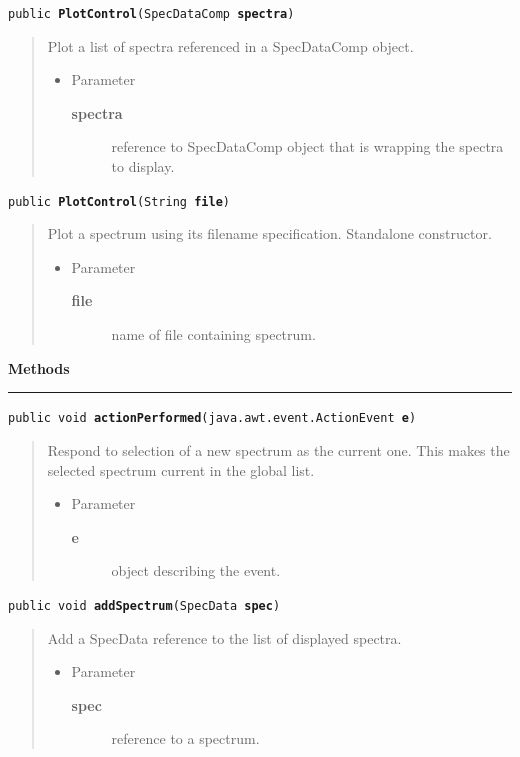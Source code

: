 \documentclass[twoside,11pt]{article}
\renewcommand{\_}{\texttt{\symbol{95}}}
\newcommand{\method}[1]{\texttt{#1}}
\newenvironment{desc}{\begin{quote}}{\end{quote}}
\newcommand{\methods}{
   \par\textbf{\large{Methods}}\\
   \hrule
}
\begin{document}
\method{public \textbf{PlotControl}(\texttt{SpecDataComp} \textbf{spectra})\label{l132}\label{l133}}
\begin{desc}Plot a list of spectra referenced in a SpecDataComp object.
\begin{itemize}
\item{Parameter
  \begin{description}
   \item[\textbf{spectra}]{reference to SpecDataComp object that is
                wrapping the spectra to display.}
  \end{description}}
\end{itemize}
\end{desc}

\method{public \textbf{PlotControl}(\texttt{String} \textbf{file})\label{l134}\label{l135}}
\begin{desc}Plot a spectrum using its filename specification. Standalone
 constructor.
\begin{itemize}
\item{Parameter
  \begin{description}
   \item[\textbf{file}]{name of file containing spectrum.}
  \end{description}}
\end{itemize}
\end{desc}

\methods
\method{public void \textbf{actionPerformed}(\texttt{java.awt.event.ActionEvent} \textbf{e})\label{l136}\label{l137}}
\begin{desc}Respond to selection of a new spectrum as the current one. This
 makes the selected spectrum current in the global list.
\begin{itemize}
\item{Parameter
  \begin{description}
   \item[\textbf{e}]{object describing the event.}
  \end{description}}
\end{itemize}
\end{desc}

\method{public void \textbf{addSpectrum}(\texttt{SpecData} \textbf{spec})\label{l138}\label{l139}}
\begin{desc}Add a SpecData reference to the list of displayed spectra.
\begin{itemize}
\item{Parameter
  \begin{description}
   \item[\textbf{spec}]{reference to a spectrum.}
  \end{description}}
\end{itemize}
\end{desc}
\end{document}
